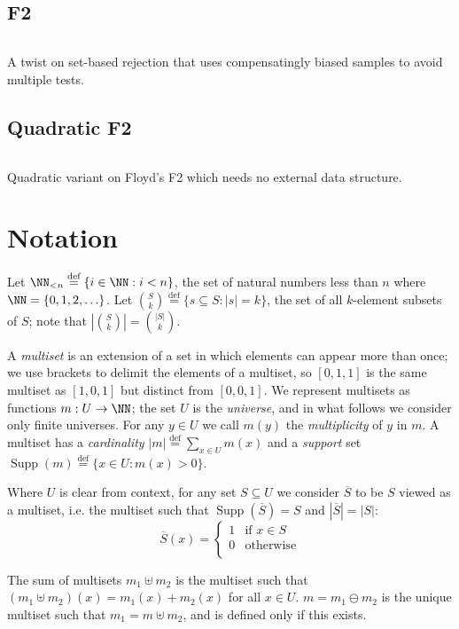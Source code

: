 \documentclass[letterpaper,luatex,11pt]{article}
\newcommand*{\defeq}{\stackrel{\text{def}}{=}}
\DeclareMathOperator{\Supp}{Supp}
\begin{document}
\subsection{F2}
\inputminted{Python}{code/floydf2.py}
A twist on set-based rejection that uses compensatingly biased
samples to avoid multiple tests.
\cite{floydf2}

\subsection{Quadratic F2}
\inputminted{Python}{code/quadraticf2.py}
Quadratic variant on Floyd's F2 which needs no external data structure.
\cite{floydf2}

\section{Notation}

Let \(\NN_{<n} \defeq \{i \in \NN: i < n\}\), the set of natural numbers less than \(n\)
where \(\NN = \{0, 1, 2, \ldots\}\). 
Let \(\binom{S}{k} \defeq \{s \subseteq S: |s| = k\}\), the set of all \(k\)-element subsets
of \(S\); note that \(\left|\binom{S}{k}\right| = \binom{|S|}{k}\).

A \emph{multiset} is an extension of a set in which elements can appear more than once;
we use brackets to delimit the elements of a multiset, so
$[0, 1, 1]$ is the same multiset as $[1, 0, 1]$ but distinct from $[0, 0, 1]$.
We represent multisets as functions $m: U \rightarrow \NN$; the set $U$ is the \emph{universe},
and in what follows we consider only finite universes. For any $y \in U$ we call
$m(y)$ the \emph{multiplicity} of $y$ in $m$.
A multiset has a \emph{cardinality} $|m| \defeq \sum_{x \in U} m(x)$
and a \emph{support} set $\Supp(m) \defeq \{x \in U: m(x) > 0\}$.

Where $U$ is clear from context, for any set $S \subseteq U$ we consider
$\overline{S}$ to be $S$ viewed as a multiset, i.e. the multiset
such that $\Supp(\overline{S}) = S$ and $|\overline{S}| = |S|$:
\begin{displaymath}
    \overline{S}(x) =
    \begin{cases}
        1 & \text{if $x \in S$} \\
        0 & \text{otherwise} \\
    \end{cases}
\end{displaymath}

The sum of multisets $m_1 \uplus m_2$ is the multiset such that
$(m_1 \uplus m_2)(x) = m_1(x) + m_2(x)$ for all $x \in U$.
$m = m_1 \ominus m_2$ is the unique multiset such that $m_1 = m \uplus m_2$,
and is defined only if this exists.
\end{document}
